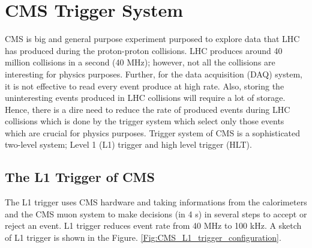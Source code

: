 \section{CMS Trigger System }
CMS is big and general purpose experiment purposed to explore data that LHC has produced during the proton-proton collisions. 
LHC produces around 40 million collisions in a second (40 MHz); however, not all the collisions are interesting for physics purposes. Further, for the data acquisition (DAQ) system, it is not effective to read every event produce at high rate.
Also, storing the uninteresting events produced in LHC collisions will require a lot of storage.
Hence, there is a dire need to reduce the rate of produced events during LHC collisions which is done by the trigger system which select only those events which are crucial for physics purposes.
Trigger system of CMS is a sophisticated two-level system; Level 1 (L1) trigger and high level trigger (HLT).

\subsection{The L1 Trigger of CMS}
The L1 trigger uses CMS hardware and taking informations from the calorimeters and the CMS muon system to make decisions (in 4 \micro s) in several steps to accept or reject an event. L1 trigger reduces event rate from 40 MHz to 100 kHz. A sketch of L1 trigger is shown in the Figure. \ref{Fig:CMS_L1_trigger_configuration}.

